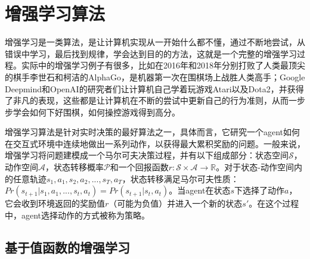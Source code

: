 

\chapter{增强学习算法}
\label{chap:RL}
增强学习是一类算法，是让计算机实现从一开始什么都不懂，通过不断地尝试，从错误中学习，最后找到规律，学会达到目的的方法，这就是一个完整的增强学习过程。实际中的增强学习例子有很多，比如在2016年和2018年分别打败了人类最顶尖的棋手李世石和柯洁的AlphaGo\cite{alphago}，是机器第一次在围棋场上战胜人类高手；Google Deepmind和OpenAI的研究者们让计算机自己学着玩游戏Atari以及Dota2，并获得了非凡的表现，这些都是让计算机在不断的尝试中更新自己的行为准则，从而一步步学会如何下好围棋，如何操控游戏得到高分。

增强学习算法是针对实时决策的最好算法之一，具体而言，它研究一个agent如何在交互式环境中连续地做出一系列动作，以获得最大累积奖励的问题。一般来说，增强学习将问题建模成一个马尔可夫决策过程，并有以下组成部分：状态空间$\mathcal{S}$，动作空间$\mathcal{A}$，状态转移概率$\mathcal{P}$和一个回报函数$r:\mathcal{S} \times \mathcal{A} \rightarrow \mathbb{R}$。对于状态-动作空间内的任意轨迹$s_1, a_1, s_2, a_2, ... , s_T, a_T$，状态转移满足马尔可夫性质：$Pr(s_{t+1}|s_1, a_1, ... , s_t, a_t) = Pr(s_{t+1}|s_t, a_t)$。当agent在状态$s$下选择了动作$a$，它会收到环境返回的奖励值$r$（可能为负值）并进入一个新的状态$s'$。在这个过程中，agent选择动作的方式被称为策略。
\section{基于值函数的增强学习}
